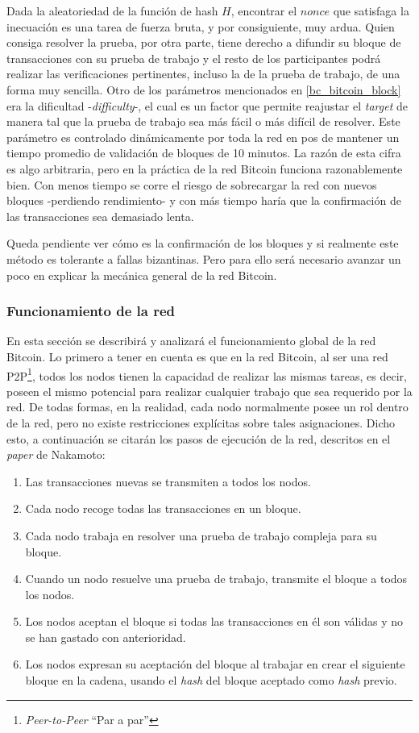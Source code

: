 Dada la aleatoriedad de la función de hash $H$, encontrar el $nonce$ que satisfaga la inecuación es una tarea de fuerza bruta, y por consiguiente, muy ardua. Quien consiga resolver la prueba, por otra parte, tiene derecho a difundir su bloque de transacciones con su prueba de trabajo y el resto de los participantes podrá realizar las verificaciones pertinentes, incluso la de la prueba de trabajo, de una forma muy sencilla. Otro de los parámetros mencionados en \ref{bc_bitcoin_block} era la dificultad -\textit{difficulty}-, el cual es un factor que permite reajustar el \textit{target} de manera tal que la prueba de trabajo sea más fácil o más difícil de resolver. Este parámetro es controlado dinámicamente por toda la red en pos de mantener un tiempo promedio de validación de bloques de 10 minutos. La razón de esta cifra es algo arbitraria, pero en la práctica de la red Bitcoin funciona razonablemente bien. Con menos tiempo se corre el riesgo de sobrecargar la red con nuevos bloques -perdiendo rendimiento- y con más tiempo haría que la confirmación de las transacciones sea demasiado lenta.

Queda pendiente ver cómo es la confirmación de los bloques y si realmente este método es tolerante a fallas bizantinas. Pero para ello será necesario avanzar un poco en explicar la mecánica general de la red Bitcoin.

\subsubsection{Funcionamiento de la red}
\label{bc_bitcoin_net_overview}

En esta sección se describirá y analizará el funcionamiento global de la red Bitcoin. Lo primero a tener en cuenta es que en la red Bitcoin, al ser una red P2P\footnote{\textit{Peer-to-Peer} ``Par a par''}, todos los nodos tienen la capacidad de realizar las mismas tareas, es decir, poseen el mismo potencial para realizar cualquier trabajo que sea requerido por la red. De todas formas, en la realidad, cada nodo normalmente posee un rol dentro de la red, pero no existe restricciones explícitas sobre tales asignaciones. Dicho esto, a continuación se citarán los pasos de ejecución de la red, descritos en el \textit{paper} de Nakamoto:

\begin{enumerate}
  \item Las transacciones nuevas se transmiten a todos los nodos.
  \item Cada nodo recoge todas las transacciones en un bloque.
  \item Cada nodo trabaja en resolver una prueba de trabajo compleja para su bloque.
  \item Cuando un nodo resuelve una prueba de trabajo, transmite el bloque a todos los nodos.
  \item Los nodos aceptan el bloque si todas las transacciones en él son válidas y no se han gastado con anterioridad.
  \item Los nodos expresan su aceptación del bloque al trabajar en crear el siguiente bloque en la cadena, usando el \textit{hash} del bloque aceptado como \textit{hash} previo.
\end{enumerate}

